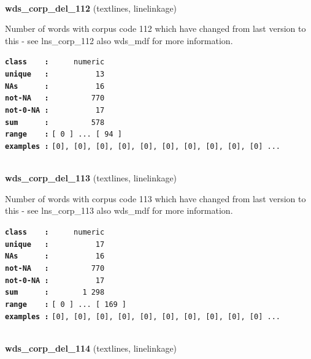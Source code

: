 \documentclass[]{article}
\begin{document}
~

\textbf{wds\_corp\_del\_112} (textlines, linelinkage)

Number of words with corpus code 112 which have changed from last
version to this - see lns\_corp\_112 also wds\_mdf for more information.

\textbf{\texttt{class\ \ \ \ :}} \texttt{~~~~~numeric}\\
\textbf{\texttt{unique\ \ \ :}} \texttt{~~~~~~~~~~13}\\
\textbf{\texttt{NAs\ \ \ \ \ \ :}} \texttt{~~~~~~~~~~16}\\
\textbf{\texttt{not-NA\ \ \ :}} \texttt{~~~~~~~~~770}\\
\textbf{\texttt{not-0-NA\ :}} \texttt{~~~~~~~~~~17}\\
\textbf{\texttt{sum\ \ \ \ \ \ :}} \texttt{~~~~~~~~~578}\\
\textbf{\texttt{range\ \ \ \ :}}
\texttt{{[}\ 0\ {]}\ ...\ {[}\ 94\ {]}}\\
\textbf{\texttt{examples\ :}}
\texttt{{[}0{]},\ {[}0{]},\ {[}0{]},\ {[}0{]},\ {[}0{]},\ {[}0{]},\ {[}0{]},\ {[}0{]},\ {[}0{]},\ {[}0{]}\ ...}\\

~

\textbf{wds\_corp\_del\_113} (textlines, linelinkage)

Number of words with corpus code 113 which have changed from last
version to this - see lns\_corp\_113 also wds\_mdf for more information.

\textbf{\texttt{class\ \ \ \ :}} \texttt{~~~~~numeric}\\
\textbf{\texttt{unique\ \ \ :}} \texttt{~~~~~~~~~~17}\\
\textbf{\texttt{NAs\ \ \ \ \ \ :}} \texttt{~~~~~~~~~~16}\\
\textbf{\texttt{not-NA\ \ \ :}} \texttt{~~~~~~~~~770}\\
\textbf{\texttt{not-0-NA\ :}} \texttt{~~~~~~~~~~17}\\
\textbf{\texttt{sum\ \ \ \ \ \ :}} \texttt{~~~~~~~1~298}\\
\textbf{\texttt{range\ \ \ \ :}}
\texttt{{[}\ 0\ {]}\ ...\ {[}\ 169\ {]}}\\
\textbf{\texttt{examples\ :}}
\texttt{{[}0{]},\ {[}0{]},\ {[}0{]},\ {[}0{]},\ {[}0{]},\ {[}0{]},\ {[}0{]},\ {[}0{]},\ {[}0{]},\ {[}0{]}\ ...}\\

~

\textbf{wds\_corp\_del\_114} (textlines, linelinkage)
\end{document}
